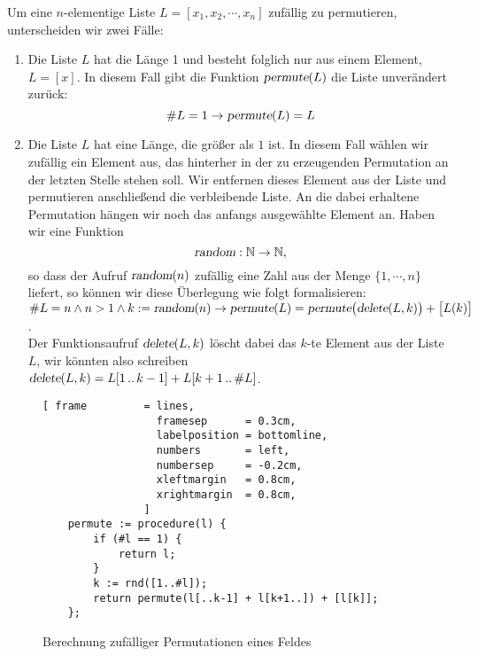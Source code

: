 Um eine $n$-elementige Liste $L = [x_1,x_2, \cdots, x_n]$ zuf\"allig zu permutieren,
unterscheiden wir zwei F\"alle:
\begin{enumerate}
\item Die Liste $L$ hat die L\"ange 1 und besteht folglich nur aus einem Element, $L = [x]$.
      In diesem Fall gibt die Funktion $\textsl{permute}(L)$ die Liste unver\"andert zur\"uck:
      \[ \#L = 1 \rightarrow \textsl{permute}(L) = L \]
\item Die Liste $L$ hat eine L\"ange, die gr\"o{\ss}er als $1$ ist.  In diesem Fall w\"ahlen wir
      zuf\"allig ein Element aus, das hinterher  in der zu erzeugenden Permutation an der letzten Stelle
      stehen soll.  Wir entfernen dieses Element aus der Liste und permutieren
      anschlie{\ss}end die verbleibende Liste.  An die dabei erhaltene Permutation h\"angen wir
      noch das anfangs ausgew\"ahlte Element an.  Haben wir eine Funktion
      \[ \textsl{random}: \mathbb{N} \rightarrow \mathbb{N}, \]
      so dass der Aufruf $\textsl{random}(n)$ zuf\"allig eine Zahl aus der Menge $\{1,\cdots,n\}$
      liefert, so k\"onnen wir diese \"Uberlegung wie folgt formalisieren:
      \\[0.2cm]
      \hspace*{0.8cm}
      $\#L = n \wedge n > 1 \wedge k :=\textsl{random}(n)  \rightarrow 
         \textsl{permute}(L) = \textsl{permute}\bigl(\textsl{delete}(L,k)\bigr) + \bigl[ L(k)
         \bigr]
      $.
\\[0.2cm]
      Der  Funktionsaufruf $\textsl{delete}(L,k)$ l\"oscht dabei das $k$-te Element aus der Liste $L$,
      wir k\"onnten also schreiben
      \\[0.2cm]
      \hspace*{1.3cm}
      $\textsl{delete}(L,k) = L[1\,..\,k-1] + L[k+1\,..\,\#L]$.
\end{enumerate}

\begin{figure}[!ht]
\centering
\begin{Verbatim}[ frame         = lines, 
                  framesep      = 0.3cm, 
                  labelposition = bottomline,
                  numbers       = left,
                  numbersep     = -0.2cm,
                  xleftmargin   = 0.8cm,
                  xrightmargin  = 0.8cm,
                ]
    permute := procedure(l) {
        if (#l == 1) {
            return l;
        }
        k := rnd([1..#l]);
        return permute(l[..k-1] + l[k+1..]) + [l[k]];
    };
\end{Verbatim}
\vspace*{-0.3cm}
\caption{Berechnung zuf\"alliger Permutationen eines Feldes}
\label{fig:permutation.stlx}
\end{figure}

